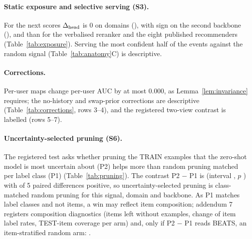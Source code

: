\paragraph{Static exposure and selective serving (S3).}
For the \textsf{next} scores $\Delta_{\rm head}$ is  0 on 
domains (), with  sign on the second backbone
(), and  than for the verbalised reranker and the eight
published recommenders (Table~\ref{tab:exposure}). Serving the most confident half of the events against the random signal
(Table~\ref{tab:anatomy}C) is descriptive.

\paragraph{Corrections.}
Per-user maps change per-user AUC by at most 0.000, as Lemma~\ref{lem:invariance} requires; the
no-history and swap-prior corrections are descriptive (Table~\ref{tab:corrections}, rows 3--4), and the registered two-view contrast
is labelled  (rows 5--7).

\paragraph{Uncertainty-selected pruning (S6).}
The registered test asks whether pruning the TRAIN examples that the zero-shot model is most uncertain about (P2) helps more than
random pruning matched per label class (P1) (Table~\ref{tab:pruning}). The contrast P2 $-$ P1 is 
(interval , $p$ ) with  of 5 paired
differences positive, so uncertainty-selected pruning is 
class-matched random pruning for this signal, domain and backbone. As P1 matches label classes and not items, a win may reflect item
composition; addendum 7 registers composition diagnostics (items left without examples, change of item label rates, TEST-item
coverage per arm) and, only if P2 $-$ P1 reads BEATS, an item-stratified random arm: .

